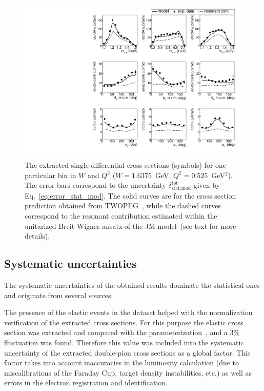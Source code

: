 \documentclass[prc,twocolumn,superscriptaddress,showpacs,amssymb,amsmath,amsfonts,aps,nofootinbib]{revtex4-1}
\begin{document}
\begin{figure}[htp!]
\begin{center}
\includegraphics[width=15cm]{pictures/topologies/res_cont.pdf}
\caption{\small 
The extracted single-differential cross sections (symbols) for one particular bin in $W$ and $Q^2$ ($W = 1.6375$~GeV, $Q^2 = 0.525$~GeV$^2$). The error bars correspond to the uncertainty $\delta_{\text{stat,mod}}^{\text{tot}}$ given by Eq.~\eqref{eq:error_stat_mod}. The solid curves are for the cross section prediction obtained from TWOPEG~\cite{Skorodum:EG}, while the dashed curves correspond to the resonant contribution estimated within the unitarized Breit-Wigner ansatz of the JM model~\cite{Mokeev:2012vsa,Mokeev:2015lda}(see text for more details).}
\label{fig:res_cont}

\end{center}
\end{figure}








\subsection{Systematic uncertainties}



The systematic uncertainties of the obtained results dominate the statistical ones and originate from several sources.

The presence of the elastic events
in the dataset helped with the normalization verification of the extracted cross sections. For this purpose the elastic cross section was extracted and compared with the parameterization~\cite{Bosted:1994tm}, and a 3\% fluctuation was found. Therefore this value was included into the systematic uncertainty  of the extracted double-pion cross sections as a global factor. This factor takes into account  inaccuracies in the luminosity calculation (due to miscalibrations of the Faraday Cup, target
density instabilities, etc.) as well as errors in the electron registration and identification.
\end{document}
